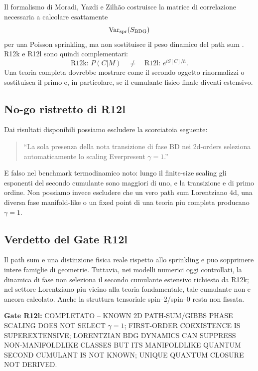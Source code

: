 \documentclass[11pt,a4paper]{article}
\newcommand{\status}[1]{\textsf{#1}}
\begin{document}
Il formalismo di Moradi, Yazdi e Zilh\~ao costruisce la matrice di correlazione necessaria a calcolare esattamente
\begin{equation}
\mathrm{Var}_{\rm spr}(S_{\rm BDG})
\end{equation}
per una Poisson sprinkling, ma non sostituisce il peso dinamico del path sum \cite{MoradiYazdiZilhao2025}. R12k e R12l sono quindi complementari:
\begin{equation}
\boxed{\text{R12k: }P(C|M)\quad\neq\quad\text{R12l: }e^{iS[C]/\hbar}.}
\end{equation}
Una teoria completa dovrebbe mostrare come il secondo oggetto rinormalizzi o sostituisca il primo e, in particolare, se il cumulante fisico finale diventi estensivo.

\subsection{No-go ristretto di R12l}

Dai risultati disponibili possiamo escludere la scorciatoia seguente:
\begin{quote}
``La sola presenza della nota transizione di fase BD nei 2d-orders seleziona automaticamente lo scaling Everpresent $\gamma=1$.''
\end{quote}
E falso nel benchmark termodinamico noto: lungo il finite-size scaling gli esponenti del secondo cumulante sono maggiori di uno, e la transizione e di primo ordine. Non possiamo invece escludere che un vero path sum Lorentziano 4d, una diversa fase manifold-like o un fixed point di una teoria piu completa producano $\gamma=1$.

\subsection{Verdetto del Gate R12l}

Il path sum e una distinzione fisica reale rispetto allo sprinkling e puo sopprimere intere famiglie di geometrie. Tuttavia, nei modelli numerici oggi controllati, la dinamica di fase non seleziona il secondo cumulante estensivo richiesto da R12k; nel settore Lorentziano piu vicino alla teoria fondamentale, tale cumulante non e ancora calcolato. Anche la struttura tensoriale spin--2/spin--0 resta non fissata.

\textbf{Gate R12l:}
\status{COMPLETATO -- KNOWN 2D PATH-SUM/GIBBS PHASE SCALING DOES NOT SELECT $\gamma=1$; FIRST-ORDER COEXISTENCE IS SUPEREXTENSIVE; LORENTZIAN BDG DYNAMICS CAN SUPPRESS NON-MANIFOLDLIKE CLASSES BUT ITS MANIFOLDLIKE QUANTUM SECOND CUMULANT IS NOT KNOWN; UNIQUE QUANTUM CLOSURE NOT DERIVED.}
\end{document}
